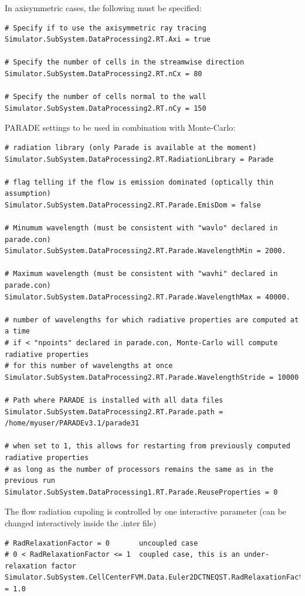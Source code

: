 \documentclass[11pt]{article}
\begin{document}
In axisymmetric cases, the following must be specified:
 
\begin{lstlisting}[breaklines]
# Specify if to use the axisymmetric ray tracing
Simulator.SubSystem.DataProcessing2.RT.Axi = true

# Specify the number of cells in the streamwise direction
Simulator.SubSystem.DataProcessing2.RT.nCx = 80

# Specify the number of cells normal to the wall
Simulator.SubSystem.DataProcessing2.RT.nCy = 150
\end{lstlisting}

PARADE settings to be used in combination with Monte-Carlo:

\begin{lstlisting}[breaklines]
# radiation library (only Parade is available at the moment)
Simulator.SubSystem.DataProcessing2.RT.RadiationLibrary = Parade

# flag telling if the flow is emission dominated (optically thin assumption) 
Simulator.SubSystem.DataProcessing2.RT.Parade.EmisDom = false

# Minumum wavelength (must be consistent with "wavlo" declared in parade.con) 
Simulator.SubSystem.DataProcessing2.RT.Parade.WavelengthMin = 2000.

# Maximum wavelength (must be consistent with "wavhi" declared in parade.con) 
Simulator.SubSystem.DataProcessing2.RT.Parade.WavelengthMax = 40000.

# number of wavelengths for which radiative properties are computed at a time
# if < "npoints" declared in parade.con, Monte-Carlo will compute radiative properties
# for this number of wavelengths at once 
Simulator.SubSystem.DataProcessing2.RT.Parade.WavelengthStride = 10000

# Path where PARADE is installed with all data files
Simulator.SubSystem.DataProcessing2.RT.Parade.path = /home/myuser/PARADEv3.1/parade31

# when set to 1, this allows for restarting from previously computed radiative properties
# as long as the number of processors remains the same as in the previous run 
Simulator.SubSystem.DataProcessing1.RT.Parade.ReuseProperties = 0
\end{lstlisting}

The flow radiation cupoling is controlled by one interactive parameter (can be changed interactively inside the .inter file)

\begin{lstlisting}[breaklines]
# RadRelaxationFactor = 0       uncoupled case
# 0 < RadRelaxationFactor <= 1  coupled case, this is an under-relaxation factor    
Simulator.SubSystem.CellCenterFVM.Data.Euler2DCTNEQST.RadRelaxationFactor = 1.0
\end{lstlisting}
\end{document}
